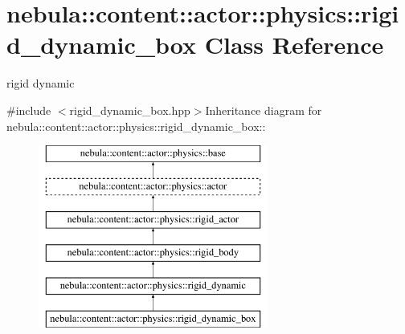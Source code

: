 \hypertarget{classnebula_1_1content_1_1actor_1_1physics_1_1rigid__dynamic__box}{
\section{nebula::content::actor::physics::rigid\_\-dynamic\_\-box Class Reference}
\label{classnebula_1_1content_1_1actor_1_1physics_1_1rigid__dynamic__box}
}


rigid dynamic  


{\ttfamily \#include $<$rigid\_\-dynamic\_\-box.hpp$>$}Inheritance diagram for nebula::content::actor::physics::rigid\_\-dynamic\_\-box::\begin{figure}[H]
\begin{center}
\leavevmode
\includegraphics[height=6cm]{classnebula_1_1content_1_1actor_1_1physics_1_1rigid__dynamic__box}
\end{center}
\end{figure}
